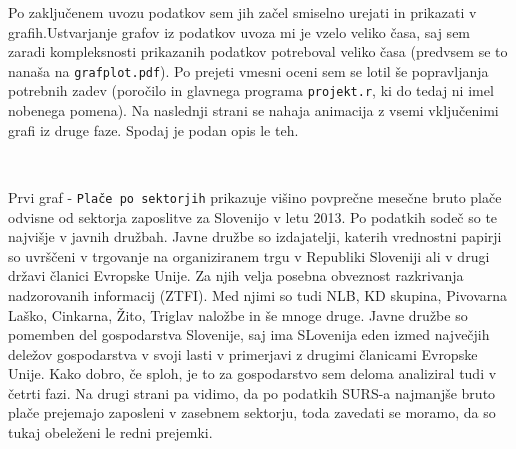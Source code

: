 \documentclass[11pt,a4paper]{article}
\begin{document}
Po zaključenem uvozu podatkov sem jih začel smiselno urejati in prikazati v grafih.Ustvarjanje grafov iz podatkov uvoza mi je vzelo veliko časa, saj sem zaradi kompleksnosti prikazanih podatkov potreboval veliko časa (pred\-vsem se to nanaša na \verb|grafplot.pdf|). Po prejeti vmesni oceni sem se lotil še popravljanja potrebnih zadev (poročilo in glavnega programa \verb|projekt.r|, ki do tedaj ni imel nobenega pomena). Na naslednji strani se nahaja animacija z vsemi vključenimi grafi iz druge faze. Spodaj je podan opis le teh.
% 
% 
% 
% 
% 
% 
% 
% 
% 
% 
% 
% 
% 
% 
% 

\begin{center}
\\
\end{center}

Prvi graf - \verb|Plače po sektorjih| prikazuje višino povprečne mesečne bru\-to plače odvisne od sektorja zaposlitve za Slovenijo v letu 2013. Po podatkih sodeč so te najvišje v javnih družbah. Javne družbe so izdajatelji, katerih vrednostni papirji so uvrščeni v trgovanje na organiziranem trgu v Republiki Sloveniji ali v drugi državi članici Evropske Unije. Za njih velja posebna obveznost razkrivanja nadzorovanih informacij (ZTFI). Med njimi so tudi NLB, KD skupina, Pivovarna Laško, Cinkarna, Žito, Triglav naložbe in še mnoge druge. Javne družbe so pomemben del gospodarstva Slovenije, saj ima SLovenija eden izmed največjih deležov gospodarstva v svoji lasti v primerjavi z drugimi članicami Evropske Unije. Kako dobro, če sploh, je to za gospodarstvo sem deloma analiziral tudi v četrti fazi. Na drugi strani pa vidimo, da po podatkih SURS-a najmanjše bruto plače prejemajo zaposleni v zasebnem sektorju, toda zavedati se moramo, da so tukaj obeleženi le redni prejemki.
\end{document}
